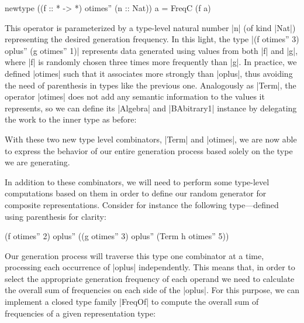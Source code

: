 \begin{code}
newtype ((f :: * -> *) otimes'' (n :: Nat)) a = FreqC (f a)
\end{code}
%
This operator is parameterized by a type-level natural number |n| (of kind |Nat|)
representing the desired generation frequency.
%
In this light, the type |(f otimes'' 3) oplus'' (g otimes'' 1)| represents data
generated using values from both |f| and |g|, where |f| is randomly chosen three
times more frequently than |g|.
%
In practice, we defined |otimes| such that it associates more strongly than
|oplus|, thus avoiding the need of parenthesis in types like the previous one.
%
Analogously as |Term|, the operator |otimes| does not add any semantic
information to the values it represents, so we can define its |Algebra| and
|BAbitrary1| instance by delegating the work to the inner type as before:



With these two new type level combinators, |Term| and |otimes|, we are now able
to express the behavior of our entire generation process based solely on the
type we are generating.


In addition to these combinators, we will need to perform some type-level
computations based on them in order to define our random generator for composite
representations.
%
Consider for instance the following type---defined using parenthesis for clarity:

\begin{code}
(f otimes'' 2) oplus'' ((g otimes'' 3) oplus'' (Term h otimes'' 5))
\end{code}
%
Our generation process will traverse this type one combinator at a time,
processing each occurrence of |oplus| independently.
%
This means that, in order to select the appropriate generation frequency of each
operand we need to calculate the overall sum of frequencies on each side of the
|oplus|.
%
For this purpose, we can implement a closed type family |FreqOf| to compute the
overall sum of frequencies of a given representation type:

